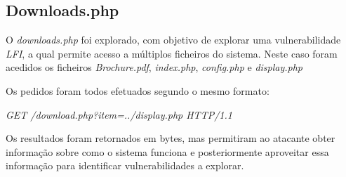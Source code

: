 \documentclass[10pt,english]{article}
\begin{document}
\subsection{Downloads.php}
\par O \textit{downloads.php} foi explorado, com objetivo de explorar uma vulnerabilidade \textit{LFI}, a qual permite acesso a múltiplos ficheiros do sistema. Neste caso foram acedidos os ficheiros \textit{Brochure.pdf}, \textit{index.php}, \textit{config.php} e \textit{display.php}
\par Os pedidos foram todos efetuados segundo o mesmo formato:
\par \textit{GET /download.php?item=../display.php HTTP/1.1}
\bigskip
\par Os resultados foram retornados em bytes, mas permitiram ao atacante obter informação sobre como o sistema funciona e posteriormente aproveitar essa informação para identificar vulnerabilidades a explorar.
\end{document}
